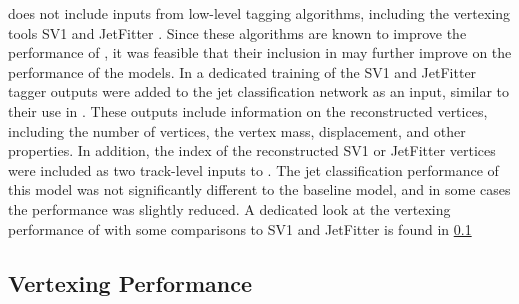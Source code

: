 \GNN does not include inputs from low-level tagging algorithms, including the vertexing tools SV1 and JetFitter \cite{FTAG-2018-01}.
Since these algorithms are known to improve the performance of \DLr, it was feasible that their inclusion in \GNN may further improve on the performance of the \GNN models.
In a dedicated training of \GNN the SV1 and JetFitter tagger outputs were added to the \GNN jet classification network as an input, similar to their use in \DLr.
These outputs include information on the reconstructed vertices, including the number of vertices, the vertex mass, displacement, and other properties.
In addition, the index of the reconstructed SV1 or JetFitter vertices were included as two track-level inputs to \GNN. 
The jet classification performance of this \GNN model was not significantly different to the baseline model, and in some cases the performance was slightly reduced.
A dedicated look at the vertexing performance of \GNN with some comparisons to SV1 and JetFitter is found in \cref{sec:gnn_vert_perf}







\subsection{Vertexing Performance}\label{sec:gnn_vert_perf}

